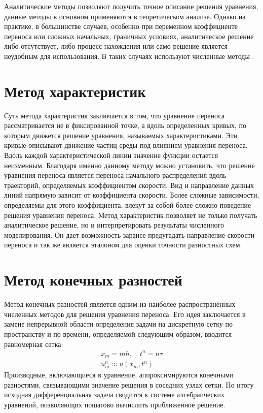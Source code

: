 \documentclass[a4paper,14pt]{extreport}
\begin{document}
Аналитические методы позволяют получить точное описание решения уравнения, данные методы в основном применяются в теоретическом анализе. Однако на практике, в большинстве случаев, особенно при переменном коэффициенте переноса или сложных начальных, граничных условиях, аналитическое решение либо отсутствует, либо процесс нахождения или само решение является неудобным для использования. В таких случаях используют численные методы \cite{bakhvalov, hakimzyanov}.

\section*{Метод характеристик}

Суть метода характеристик \cite{bakhvalov, popov, hakimzyanov} заключается в том, что уравнение переноса рассматривается не в фиксированной точке, а вдоль определенных кривых, по которым движется решение уравнения, называемых характеристиками. Эти кривые описывают движение частиц среды под влиянием уравнения переноса. Вдоль каждой характеристической линии значение функции остается неизменным. Благодаря именно данному методу можно установить, что решение уравнения переноса является переноса начального распределения вдоль траекторий, определяемых коэффициентом скорости. Вид и направление данных линий напрямую зависит от коэффициента скорости. Более сложные зависимости, определяемы для этого коэффициента, влекут за собой более сложно поведение решения уравнения переноса. Метод характеристик позволяет не только получать аналитическое решение, но и интерпретировать результаты численного моделирования. Он дает возможность заранее предугадать направление скорости переноса и так же является эталоном для оценки точности разностных схем.

\section*{Метод конечных разностей}

Метод конечных разностей \cite{bakhvalov, popov, hakimzyanov} является одним из наиболее распространенных численных методов для решения уравнения переноса. Его идея заключается в замене непрерывной области определения задачи на дискретную сетку по пространству и по времени, определяемой следующим образом, вводится равномерная сетка:
\begin{gather*}
x_m = m h, \quad t^n = n \tau \\
u_m^n \approx u(x_m, t^n)
\end{gather*}
Производные, включающиеся в уравнение, аппроксимируются конечными разностями, связывающими значение решения в соседних узлах сетки. По итогу исходная дифференциальная задача сводится к системе алгебраических уравнений, позволяющих пошагово вычислить приближенное решение.
\end{document}
